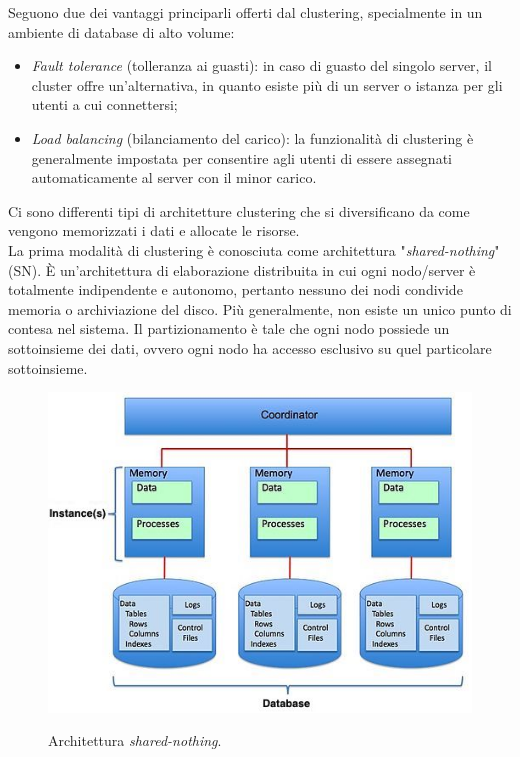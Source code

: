 Seguono due dei vantaggi principarli offerti dal clustering, specialmente in un ambiente di database di alto volume:
\begin{itemize}
\item 
\textit{Fault tolerance} (tolleranza ai guasti): in caso di guasto del singolo server, il cluster offre un'alternativa, in quanto esiste pi\`{u} di un server o istanza per gli utenti a cui connettersi;
\item
\textit{Load balancing} (bilanciamento del carico): la funzionalit\`{a} di clustering \`{e} generalmente impostata per consentire agli utenti di essere assegnati automaticamente al server con il minor carico\cite{etichetta1}. 
\end{itemize}
Ci sono differenti tipi di architetture clustering che si diversificano da come vengono memorizzati i dati e allocate le risorse.\\
La prima modalit\`{a} di clustering \`{e} conosciuta come architettura "\textit{shared-nothing}" (SN). \`{E} un'architettura di elaborazione distribuita in cui ogni nodo/server \`{e} totalmente indipendente e autonomo, pertanto nessuno dei nodi condivide memoria o archiviazione del disco. Pi\`{u} generalmente, non esiste un unico punto di contesa nel sistema\cite{etichetta5}. Il partizionamento \`{e} tale che ogni nodo possiede un sottoinsieme dei dati, ovvero ogni nodo ha accesso esclusivo su quel particolare sottoinsieme\cite{etichetta2}.\\

\begin{figure}[htbp]
\centering
\includegraphics[scale=0.70]{img/Shared_Nothing_Architecture.jpg}\\
\caption{Architettura \textit{shared-nothing}\cite{etichetta5}.}
\label{fig:Shared_Nothing_Architecture}
\end{figure}

